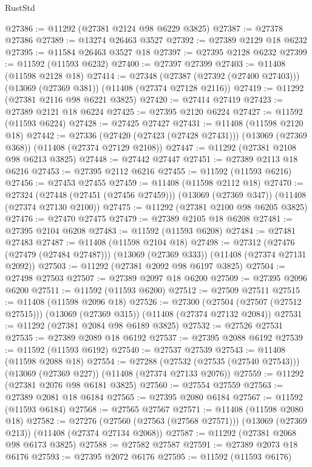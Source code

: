 \begin{lexlean}{RustStd}
\begin{coremodule}
@27386 := @11292 (@27381 @2124 @98 @6229 @3825)
@27387 := @27378 @27386
@27389 := @13274 @26463 @3527
@27392 := @27389 @2129 @18 @6232
@27395 := @11584 @26463 @3527 @18
@27397 := @27395 @2128 @6232
@27399 := @11592 (@11593 @6232)
@27400 := @27397 @27399
@27403 := @11408 (@11598 @2128 @18)
@27414 := @27348
    (@27387 (@27392 (@27400 @27403)))
    (@13069 (@27369 @381))
    (@11408 (@27374 @27128 @2116))
@27419 := @11292 (@27381 @2116 @98 @6221 @3825)
@27420 := @27414 @27419
@27423 := @27389 @2121 @18 @6224
@27425 := @27395 @2120 @6224
@27427 := @11592 (@11593 @6224)
@27428 := @27425 @27427
@27431 := @11408 (@11598 @2120 @18)
@27442 := @27336
    (@27420 (@27423 (@27428 @27431)))
    (@13069 (@27369 @368))
    (@11408 (@27374 @27129 @2108))
@27447 := @11292 (@27381 @2108 @98 @6213 @3825)
@27448 := @27442 @27447
@27451 := @27389 @2113 @18 @6216
@27453 := @27395 @2112 @6216
@27455 := @11592 (@11593 @6216)
@27456 := @27453 @27455
@27459 := @11408 (@11598 @2112 @18)
@27470 := @27324
    (@27448 (@27451 (@27456 @27459)))
    (@13069 (@27369 @347))
    (@11408 (@27374 @27130 @2100))
@27475 := @11292 (@27381 @2100 @98 @6205 @3825)
@27476 := @27470 @27475
@27479 := @27389 @2105 @18 @6208
@27481 := @27395 @2104 @6208
@27483 := @11592 (@11593 @6208)
@27484 := @27481 @27483
@27487 := @11408 (@11598 @2104 @18)
@27498 := @27312
    (@27476 (@27479 (@27484 @27487)))
    (@13069 (@27369 @333))
    (@11408 (@27374 @27131 @2092))
@27503 := @11292 (@27381 @2092 @98 @6197 @3825)
@27504 := @27498 @27503
@27507 := @27389 @2097 @18 @6200
@27509 := @27395 @2096 @6200
@27511 := @11592 (@11593 @6200)
@27512 := @27509 @27511
@27515 := @11408 (@11598 @2096 @18)
@27526 := @27300
    (@27504 (@27507 (@27512 @27515)))
    (@13069 (@27369 @315))
    (@11408 (@27374 @27132 @2084))
@27531 := @11292 (@27381 @2084 @98 @6189 @3825)
@27532 := @27526 @27531
@27535 := @27389 @2089 @18 @6192
@27537 := @27395 @2088 @6192
@27539 := @11592 (@11593 @6192)
@27540 := @27537 @27539
@27543 := @11408 (@11598 @2088 @18)
@27554 := @27288
    (@27532 (@27535 (@27540 @27543)))
    (@13069 (@27369 @227))
    (@11408 (@27374 @27133 @2076))
@27559 := @11292 (@27381 @2076 @98 @6181 @3825)
@27560 := @27554 @27559
@27563 := @27389 @2081 @18 @6184
@27565 := @27395 @2080 @6184
@27567 := @11592 (@11593 @6184)
@27568 := @27565 @27567
@27571 := @11408 (@11598 @2080 @18)
@27582 := @27276
    (@27560 (@27563 (@27568 @27571)))
    (@13069 (@27369 @213))
    (@11408 (@27374 @27134 @2068))
@27587 := @11292 (@27381 @2068 @98 @6173 @3825)
@27588 := @27582 @27587
@27591 := @27389 @2073 @18 @6176
@27593 := @27395 @2072 @6176
@27595 := @11592 (@11593 @6176)

\end{coremodule}
\end{lexlean}
